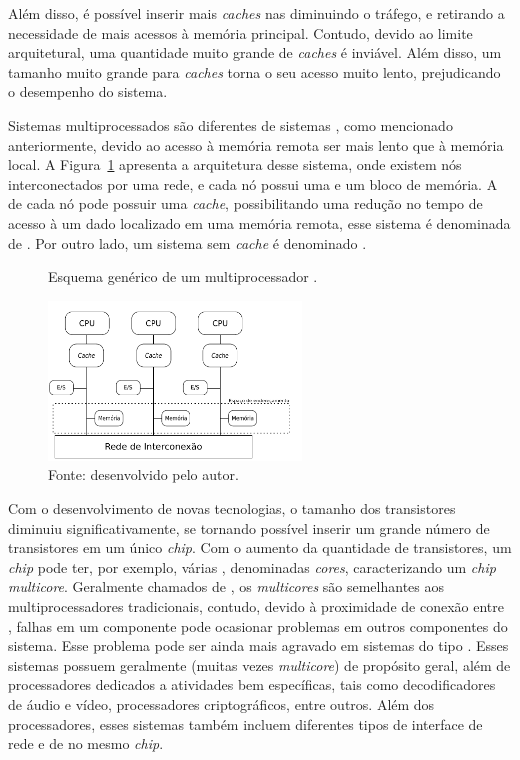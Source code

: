 Além disso, é possível inserir mais \textit{caches} nas \cpus
diminuindo o tráfego, e retirando a necessidade de mais acessos à memória
principal. Contudo, devido ao limite arquitetural, uma quantidade muito grande
de \textit{caches} é inviável. Além disso, um tamanho muito grande para
\textit{caches} torna o seu acesso muito lento, prejudicando o desempenho do
sistema.

Sistemas multiprocessados \numa são diferentes de sistemas \uma, como mencionado
anteriormente, devido ao acesso à memória remota ser mais lento que à memória
local. A Figura~\ref{fig:numa} apresenta a arquitetura desse sistema, onde
existem nós interconectados por uma rede, e cada nó possui uma \cpu e um bloco
de memória. A \cpu de cada nó pode possuir uma \textit{cache}, possibilitando
uma redução no tempo de acesso à um dado localizado em uma memória remota, esse
sistema é denominada de \ccnuma. Por outro lado, um sistema sem \textit{cache} é
denominado \ncnuma.

\begin{figure}[t]
	\centering
    \caption{Esquema genérico de um multiprocessador \numa.}
    \includegraphics[width=0.6\textwidth]{figs/multiprocNUMA.pdf}
    \caption*{Fonte: desenvolvido pelo autor.}
    \label{fig:numa}
\end{figure}

Com o desenvolvimento de novas tecnologias, o tamanho
dos transistores diminuiu significativamente, se tornando possível inserir um
grande número de transistores em um único \textit{chip}.
Com o aumento da quantidade de transistores, um \textit{chip} pode ter, por
exemplo, várias \cpus, denominadas \textit{cores}, caracterizando um
\textit{chip} \textit{multicore}.
Geralmente chamados de \cmps, os \textit{multicores} são semelhantes aos multiprocessadores
tradicionais, contudo, devido à proximidade de conexão entre \cpus, falhas em um
componente pode ocasionar problemas em outros componentes do sistema.
Esse problema pode ser ainda mais agravado em sistemas do tipo \mpsoc. Esses sistemas
possuem geralmente \cpus (muitas vezes \textit{multicore}) de propósito geral, além de processadores
dedicados a atividades bem específicas, tais como decodificadores de áudio e vídeo, processadores
criptográficos, entre outros. Além dos processadores, esses sistemas também incluem diferentes tipos
de interface de rede e de \io no mesmo \textit{chip}.

